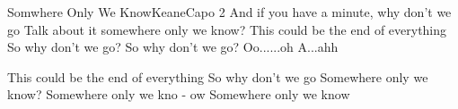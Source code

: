 \begin{song}{Somwhere Only We Know}{Keane}{Capo 2}
And if you have a minute, why don't we go
Talk about it somewhere only we know?
This could be the end of everything
So why don't we go?
So why don't we go?
        Oo......oh        A...ahh

This could be the end of everything
So why don't we go
Somewhere only we know?
Somewhere only we kno - ow
Somewhere only we know

\end{song}